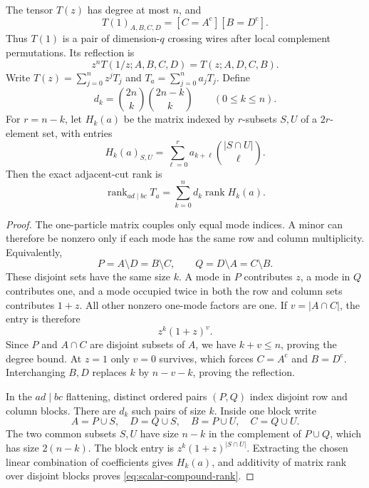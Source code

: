 \begin{proposition}
\label{prop:scalar-compound-blocks}
The tensor $T(z)$ has degree at most $n$, and
\[
 T(1)_{A,B,C,D}=[C=A^{\mathrm c}][B=D^{\mathrm c}].
\]
Thus $T(1)$ is a pair of dimension-$q$ crossing wires after local
complement permutations. Its reflection is
\begin{equation}\label{eq:scalar-compound-reflection}
 z^nT(1/z;A,B,C,D)=T(z;A,D,C,B).
\end{equation}
Write $T(z)=\sum_{j=0}^n z^jT_j$ and
$T_a=\sum_{j=0}^n a_jT_j$. Define
\[
 d_k=\binom{2n}{k}\binom{2n-k}{k}\qquad(0\leq k\leq n).
\]
For $r=n-k$, let $H_k(a)$ be the matrix indexed by $r$-subsets
$S,U$ of a $2r$-element set, with entries
\[
 H_k(a)_{S,U}=\sum_{\ell=0}^{r}
                a_{k+\ell}\binom{|S\cap U|}{\ell}.
\]
Then the exact adjacent-cut rank is
\begin{equation}\label{eq:scalar-compound-rank}
 \operatorname{rank}_{ad\mid bc}T_a
 =\sum_{k=0}^n d_k\operatorname{rank}H_k(a).
\end{equation}
\end{proposition}
\begin{proof}
The one-particle matrix couples only equal mode indices. A minor can
therefore be nonzero only if each mode has the same row and column
multiplicity. Equivalently,
\[
 P=A\setminus D=B\setminus C,\qquad
 Q=D\setminus A=C\setminus B.
\]
These disjoint sets have the same size $k$. A mode in $P$ contributes
$z$, a mode in $Q$ contributes one, and a mode occupied twice in
both the row and column sets contributes $1+z$. All other nonzero
one-mode factors are one. If $v=|A\cap C|$, the entry is therefore
\[
 z^k(1+z)^v.
\]
Since $P$ and $A\cap C$ are disjoint subsets of $A$, we have
$k+v\leq n$, proving the degree bound. At $z=1$ only $v=0$
survives, which forces $C=A^{\mathrm c}$ and $B=D^{\mathrm c}$.
Interchanging $B,D$ replaces $k$ by $n-v-k$, proving the reflection.

In the $ad\mid bc$ flattening, distinct ordered pairs $(P,Q)$
index disjoint row and column blocks. There are $d_k$ such pairs
of size $k$. Inside one block write
\[
 A=P\cup S,\quad D=Q\cup S,\quad
 B=P\cup U,\quad C=Q\cup U.
\]
The two common subsets $S,U$ have size $n-k$ in the complement
of $P\cup Q$, which has size $2(n-k)$. The block entry is
$z^k(1+z)^{|S\cap U|}$. Extracting the chosen linear combination
of coefficients gives $H_k(a)$, and additivity of matrix rank over
disjoint blocks proves \eqref{eq:scalar-compound-rank}.
\end{proof}

